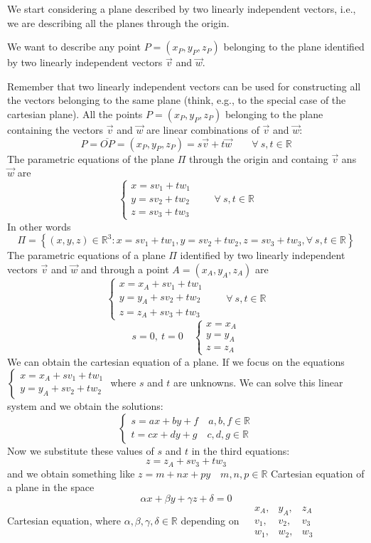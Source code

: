 We start considering a plane described by two linearly independent vectors, i.e., we are describing all the planes through the origin.

We want to describe any point $P=(x_P, y_P, z_P)$ belonging to the plane identified by two linearly independent vectors $\vec v$ and $\vec w$.

Remember that two linearly independent vectors can be used for constructing all the vectors belonging to the same plane (think, e.g., to the special case of the cartesian plane). All the points $P=(x_P,y_P,z_P)$ belonging to the plane containing the vectors $\vec v$ and $\vec w$ are linear combinations of $\vec v$ and $\vec w$:
$$P= \overline{OP} = (x_P, y_P, z_P) = s \vec v + t \vec w \qquad \forall \ s,t  \in \mathbb{R}$$
The parametric equations of the plane $\Pi$ through the origin and containg  $\vec v$ ans $\vec w$ are
$$\begin{cases}
    x = sv_1 + tw_1\\
    y= sv_2 + tw_2\\
    z = sv_3 + tw_3
\end{cases} \qquad \forall \ s,t \in \mathbb{R}$$
In other words
$$\Pi = \left\{ (x,y,z) \in \mathbb{R}^3 : x = sv_1 + tw_1, y = sv_2+tw_2, z = sv_3+tw_3, \forall \ s,t \in \mathbb{R} \right\}$$
The parametric equations of a plane $\Pi$ identified by two linearly independent vectors $\vec v$ and $\vec w$ and through a point $A = (x_A, y_A, z_A)$ are
$$\begin{cases}
    x = x_A +  sv_1 + tw_1\\
    y= y_A + sv_2 + tw_2\\
    z = z_A +  sv_3 + tw_3
\end{cases} \qquad \forall \ s,t \in \mathbb{R}$$
$$s = 0,\ t= 0 \quad \begin{cases}
    x = x_A \\
    y = y_A \\
    z = z_A
\end{cases}$$
We can obtain the cartesian equation of a plane. If we focus on the equations $\begin{cases}
    x = x_A + sv_1 + tw_1 \\
    y = y_A + sv_2 + tw_2
\end{cases}$ where $s$ and $t$ are unknowns. We can solve this linear system and we obtain the solutions:
$$\begin{cases}
    s = ax+by+f \quad a,b,f \in \mathbb{R}\\
    t = cx+dy+g \quad c,d,g \in \mathbb{R}
\end{cases}$$
Now we substitute these values of $s$ and $t$ in the third equations:
$$z = z_A + sv_3 + tw_3$$
and we obtain something like $z = m+nx+py \quad m,n,p \in \mathbb{R}$ Cartesian equation of a plane in the space 
$$\alpha x + \beta y + \gamma z + \delta = 0$$
Cartesian equation, where $\alpha, \beta, \gamma, \delta \in \mathbb{R}$ depending on $\begin{matrix} &x_A,&y_A, &z_A \\  &v_1,&v_2,&v_3\\ &w_1,&w_2,&w_3 \end{matrix}$
